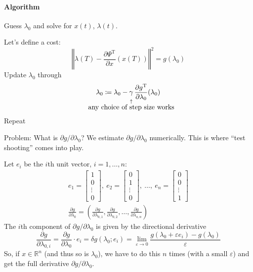 \documentclass[letterpaper,12pt,titlepage]{report}
\newcommand{\trans}{^\text{T}}
\newcommand*\pder[2]{\frac{\partial #1}{\partial #2}}
\newcommand*\R{\mathbb{R}}
\theoremstyle{plain}
\theoremstyle{definition}
\begin{document}
\paragraph{Algorithm}
Guess $\lambda_0$ and solve for $x(t)$, $\lambda(t)$.
\begin{center}
\end{center}
Let's define a cost:
\[ \left\Vert \lambda(T) - \pder{\Psi\trans}{x}(x(T)) \right\Vert^2 = g(\lambda_0) \]
Update $\lambda_0$ through
\[ \lambda_0 \coloneqq \lambda_0 - \underbracket[0pt]{\gamma}_{\mathclap{\substack{\uparrow\\ \text{\normalsize any choice of step size works}}}} \pder{g\trans}{\lambda_0}(\lambda_0) \]
Repeat

\medskip

\noindent
Problem: What is $\partial g/\partial\lambda_0$? We estimate $\partial g/\partial\lambda_0$ numerically. This is where ``test shooting'' comes into play.

Let $e_i$ be the $i$th unit vector, $i=1,\dots,n$:
\begin{gather}
    e_1 = \begin{bmatrix}
    1 \\ 0 \\ \vdots \\ 0
  \end{bmatrix}\!,\ 
  e_2 = \begin{bmatrix}
    0 \\ 1 \\ \vdots \\ 0
  \end{bmatrix}\!,\ 
  \dots,\ 
  e_n = \begin{bmatrix}
    0 \\ 0 \\ \vdots \\ 1
  \end{bmatrix} \\
  \pder{g}{\lambda_0} = \left( \pder{g}{\lambda_{0,1}},\pder{g}{\lambda_{0,2}},\dots,\pder{g}{\lambda_{o,n}} \right)
\end{gather}
The $i$th component of $\partial g/\partial\lambda_0$ is given by the directional derivative
\[
    \pder{g}{\lambda_{0,i}} = \pder{g}{\lambda_0} \cdot e_i = \delta g(\lambda_0;e_i) = \lim_{\varepsilon\to0} \frac{g(\lambda_0+\varepsilon e_i) - g(\lambda_0)}{\varepsilon}
\]
So, if $x\in\R^n$ (and thus so is $\lambda_0$), we have to do this $n$ times (with a small $\varepsilon$) and get the full derivative $\partial g/\partial\lambda_0$.
\end{document}
